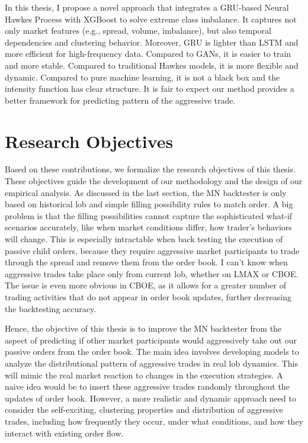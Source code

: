In this thesis, I propose a novel approach that integrates a GRU-based Neural Hawkes Process with XGBoost to solve extreme class imbalance. It captures not only market features (e.g., spread, volume, imbalance), but also temporal dependencies and clustering behavior. Moreover, GRU is lighter than LSTM and more efficient for high-frequency data. Compared to GANs, it is easier to train and more stable. Compared to traditional Hawkes models, it is more flexible and dynamic. Compared to pure machine learning, it is not a black box and the intensity function has clear structure. It is fair to expect our method provides a better framework for predicting pattern of the aggressive trade.

\section{Research Objectives}\label{sec:researchobjectives}
Based on these contributions, we formalize the research objectives of this thesis. These objectives guide the development of our methodology and the design of our empirical analysis.
As discussed in the last section, the MN backtester is only based on historical \gls{lob} and simple filling possibility rules to match order. A big problem is that the filling possibilities cannot capture the sophisticated what-if scenarios accurately, like when market conditions differ, how trader's behaviors will change. This is especially intractable when back testing the execution of passive child orders, because they require aggressive market participants to trade through the spread and remove them from the order book. I can't know when aggressive trades take place only from current \gls{lob}, whether on LMAX or CBOE. The issue is even more obvious in CBOE, as it allows for a greater number of trading activities that do not appear in order book updates, further decreasing the backtesting accuracy. 

Hence, the objective of this thesis is to improve the MN backtester from the aspect of predicting if other market participants would aggressively take out our passive orders from the order book. The main idea involves developing models to analyze the distributional pattern of aggressive trades in real \gls{lob} dynamics. This will mimic the real market reaction to changes in the execution strategies. A naive idea would be to insert these aggressive trades randomly throughout the updates of order book. However, a more realistic and dynamic approach need to consider the self-exciting, clustering properties and distribution of aggressive trades, including how frequently they occur, under what conditions, and how they interact with existing order flow.

